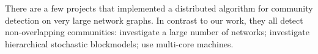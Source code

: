 \begin{comment}
Since our SG-MCMC algorithm is completely different from deep-learning
algorithms, it makes no real sense to compare to the learning frameworks
Theano, Caffe, cuDNN, or NVidia Digits, even though they target GPUs.

SG-MCMC work NOT on GPUs:

GPU work:
MCMC Hamiltonian:
	1. Andrew L. Beam, Sujit K. Ghosh, Jon Doyle
		Fast Hamiltonian Monte Carlo Using GPU Computing
		http://arxiv.org/pdf/1402.4089.pdf
MMSB tensor:

MCMC (not SG):
    1. Alan Medlar, Dorota Głowacka, Horia Stanescu, Kevin Bryson, Robert Kleta
       SwiftLink: Parallel MCMC linkage analysis utilising multicore CPU and GPU
       http://bioinformatics.oxfordjournals.org/content/early/2012/12/13/bioinformatics.bts704.full.pdf
    2. Marc Suchard, Chris Holmes, Mike West
       Some of the What?, Why?, How?, Who?  and Where?  of Graphics Processing Unit Computing for Bayesian Analysis
       https://stat.duke.edu/gpustatsci/GPU-ISBABull2010.pdf
\end{comment}

\begin{comment}
In this paper, we describe our custom RDMA D-KV (Distributed Key-Value)
store. Current RMDA D-KV store implementations are RamCloud~\cite{RamCloud},
Pilaf~\cite{Pilaf}, Herd~\cite{Herd} and FaRM~\cite{FaRM}. All these systems
use RDMA to implement a D-KV store. However, all of them are far more powerful
than our custom implementation -- and this power comes at a cost that we
can avoid. They implement a generic D-KV store that controls concurrency,
supports dynamic inserts and deletes, supports variable-sized values
(whose size may change at an update), and keys of arbitrary type. Because
of the nature of our distributed algorithm, we have to deal with none of
these issues. For us, values are fixed-size, allocated only at the initial
population, and remain alive forever. We have no concurrency between writes
and reads or other writes. Our keys are a contiguous range of integers. All
these properties together allow an extremely low-overhead implementation
that does not involve the remote host in any transaction.
\end{comment}

There are a few projects that implemented a distributed algorithm
for community detection on very large network graphs. In contrast to our work,
they all detect non-overlapping communities: \cite{Bu2013246} investigate a
large number of networks; \cite{2015arXiv150302115L} investigate hierarchical
stochastic blockmodels; \cite{Prat-Perez:2014:HQS:2566486.2568010} use
multi-core machines.


